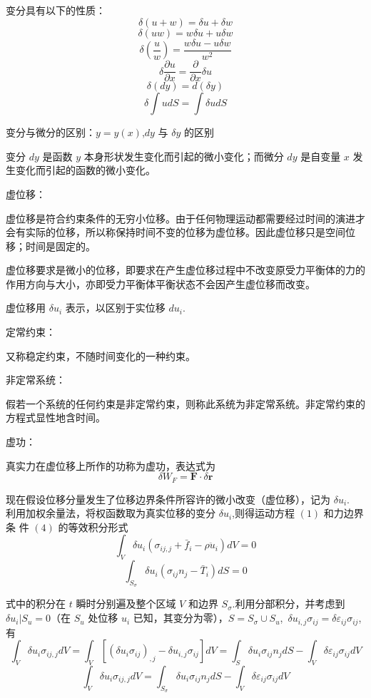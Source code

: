 \documentclass[12pt,a4paper]{article}
\begin{document}
变分具有以下的性质：
$$
\delta (u+w)=\delta u+\delta w
$$
$$
\delta (uw)=w\delta u+u\delta w
$$
$$
\delta (\frac{u}{w})=\frac{w\delta u-u\delta w}{w^2}
$$
$$
\delta\frac{\partial u}{\partial x}=\frac{\partial}{\partial x}\delta u
$$
$$
\delta (dy)=d(\delta y)
$$
$$
\delta\int udS=\int\delta udS
$$



变分与微分的区别：$y=y(x)$,$dy$ 与 $\delta y$ 的区别

变分 $dy$ 是函数 $y$ 本身形状发生变化而引起的微小变化；而微分 $dy$ 是自变量 $x$ 发生变化而引起的函数的微小变化。

虚位移：

虚位移是符合约束条件的无穷小位移。由于任何物理运动都需要经过时间的演进才会有实际的位移，所以称保持时间不变的位移为虚位移。因此虚位移只是空间位移；时间是固定的。

虚位移要求是微小的位移，即要求在产生虚位移过程中不改变原受力平衡体的力的作用方向与大小，亦即受力平衡体平衡状态不会因产生虚位移而改变。

虚位移用 $\delta u_i$ 表示，以区别于实位移 $du_i$.

定常约束：

又称稳定约束，不随时间变化的一种约束。

非定常系统：

假若一个系统的任何约束是非定常约束，则称此系统为非定常系统。非定常约束的方程式显性地含时间。

虚功：

真实力在虚位移上所作的功称为虚功，表达式为
$$
\delta W_F=\textbf{F}\cdot\delta\textbf{r}
$$

现在假设位移分量发生了位移边界条件所容许的微小改变（虚位移），记为 $\delta u_i$.\\


利用加权余量法，将权函数取为真实位移的变分 $\delta u_i$,则得运动方程 $(1)$ 和力边界条
件 $(4)$ 的等效积分形式
\begin{equation}
\int_{V}\delta u_i(\sigma_{ij,j}+\bar{f}_i-\rho\ddot{u}_i)dV=0
\end{equation}
\begin{equation}
\int_{S_{\sigma}}\delta u_i(\sigma_{ij}n_j-\bar{T}_i)dS=0
\end{equation}

式中的积分在 $t$ 瞬时分别遍及整个区域 $V$ 和边界 $S_{\sigma}$.利用分部积分，并考虑到 $\delta u_i|S_u=0$（在 $S_u$ 处位移 $u_i$ 已知，其变分为零），$S=S_{\sigma}\cup S_u$,~$\delta u_{i,j}\sigma_{ij}=\delta\varepsilon_{ij}\sigma_{ij}$,有
$$
\int_{V} \delta u_i\sigma_{ij,j}dV =\int_{V} [(\delta u_i\sigma_{ij})_{,j}-\delta u_{i,j}\sigma_{ij}]dV =\int_{S} \delta u_i\sigma_{ij}n_jdS-\int_{V}\delta\varepsilon_{ij}\sigma_{ij}dV
$$
\begin{equation}
\int_{V} \delta u_i\sigma_{ij,j}dV=\int_{S_{\sigma}} \delta u_i\sigma_{ij}n_jdS-\int_{V}\delta\varepsilon_{ij}\sigma_{ij}dV
\end{equation}
\end{document}
